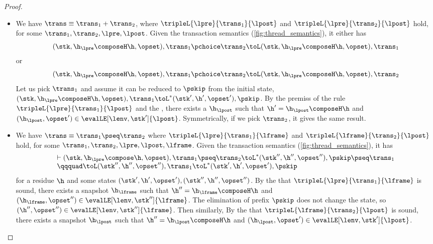 \begin{proof}
\begin{itemize}
\item {}
We have  \(\trans \equiv \trans_{1} + \trans_{2} \), where \( \tripleL{\lpre}{\trans_{1}}{\lpost} \) and \( \tripleL{\lpre}{\trans_{2}}{\lpost} \) hold, for some \( \trans_{1}, \trans_{2}, \lpre, \lpost \).
Given the transaction semantics (\cref{fig:thread_semantics}), it either has 
\[ 
( \stk, \h_\lpre \composeH \h, \opset ), \trans_{1} \pchoice \trans_{2} \toL ( \stk, \h_\lpre \composeH \h, \opset ), \trans_{1} 
\]
or  
\[ 
( \stk, \h_\lpre \composeH \h, \opset ), \trans_{1} \pchoice \trans_{2} \toL ( \stk, \h_\lpre \composeH \h, \opset ), \trans_{2} 
\]
Let us pick \( \trans_{1} \) and  assume it can be reduced to \( \pskip \) from the initial state, \ie \( ( \stk, \h_\lpre \composeH \h, \opset ), \trans_{1}  \toL^{*} ( \stk', \h', \opset' ), \pskip \).
By the premiss of the rule \( \tripleL{\lpre}{\trans_{1}}{\lpost} \) and the \ih, 
there exists a \( \h_\lpost \) such that \( \h' = \h_\lpost \composeH \h \) and  \( (\h_\lpost, \opset') \in \evalLE[\lenv, \stk']{\lpost} \).
Symmetrically, if we pick \( \trans_{2} \), it gives the same result.

\item {}
We have \( \trans \equiv \trans_{1} \pseq \trans_{2} \) where \( \tripleL{\lpre}{\trans_{1}}{\lframe} \) and \( \tripleL{\lframe}{\trans_{2}}{\lpost} \) hold, for some \( \trans_{1}, \trans_{2}, \lpre, \lpost, \lframe \).
Given the transaction semantics (\cref{fig:thread_semantics}), 
it has 
\[
    \begin{array}{l}
    \vdash ( \stk, \h_\lpre \compose \h, \opset ), \trans_{1} \pseq \trans_{2} \toL^{*} ( \stk'', \h'', \opset'' ), \pskip \pseq \trans_{1} \\
    \qqquad \toL ( \stk'', \h'', \opset'' ), \trans_{1} \toL^{*} ( \stk', \h', \opset' ), \pskip 
\end{array}
\] 
for a residue \( \h \) and  some states \( (\stk', \h', \opset'), (\stk'', \h'', \opset'') \).
By the \ih that \( \tripleL{\lpre}{\trans_{1}}{\lframe} \) is sound,
there exists a snapshot \( \h_\lframe \) such that \( \h'' = \h_\lframe \composeH \h \) and \( (\h_\lframe, \opset'') \in \evalLE[\lenv, \stk'']{\lframe} \).
The elimination of prefix \( \pskip \) does not change the state, so \( (\h'', \opset'') \in \evalLE[\lenv, \stk'']{\lframe} \).
Then similarly, 
By the \ih that \( \tripleL{\lframe}{\trans_{2}}{\lpost} \) is sound,
there exists a snapshot \( \h_\lpost \) such that \( \h'' = \h_\lpost \composeH \h \) and \( (\h_\lpost, \opset') \in \evalLE[\lenv, \stk']{\lpost} \).


\end{itemize}
\end{proof}
